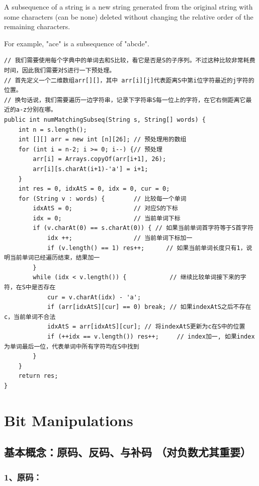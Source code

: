 \documentclass[9pt, b5paaper]{book}
\begin{document}
A subsequence of a string is a new string generated from the original string with some characters (can be none) deleted without changing the relative order of the remaining characters.

For example, "ace" is a subsequence of "abcde".
\begin{verbatim}
// 我们需要使用每个字典中的单词去和S比较，看它是否是S的子序列。不过这种比较非常耗费时间，因此我们需要对S进行一下预处理。
// 首先定义一个二维数组arr[][]，其中 arr[i][j]代表距离S中第i位字符最近的j字符的位置。
// 换句话说，我们需要遍历一边字符串，记录下字符串S每一位上的字符，在它右侧距离它最近的a-z分别在哪。
public int numMatchingSubseq(String s, String[] words) {
    int n = s.length();
    int [][] arr = new int [n][26]; // 预处理用的数组
    for (int i = n-2; i >= 0; i--) {// 预处理
        arr[i] = Arrays.copyOf(arr[i+1], 26);
        arr[i][s.charAt(i+1)-'a'] = i+1;
    }
    int res = 0, idxAtS = 0, idx = 0, cur = 0;
    for (String v : words) {        // 比较每一个单词
        idxAtS = 0;                 // 对应S的下标
        idx = 0;                    // 当前单词下标
        if (v.charAt(0) == s.charAt(0)) { // 如果当前单词首字符等于S首字符
            idx ++;                 // 当前单词下标加一
            if (v.length() == 1) res++;      // 如果当前单词长度只有1，说明当前单词已经遍历结束，结果加一
        }
        while (idx < v.length()) {            // 继续比较单词接下来的字符，在S中是否存在
            cur = v.charAt(idx) - 'a';
            if (arr[idxAtS][cur] == 0) break; // 如果indexAtS之后不存在c，当前单词不合法
            idxAtS = arr[idxAtS][cur]; // 将indexAtS更新为c在S中的位置
            if (++idx == v.length()) res++;     // index加一, 如果index为单词最后一位，代表单词中所有字符均在S中找到
        }
    }
    return res;
}
\end{verbatim}

\chapter{Bit Manipulations}
\label{sec-10}
\section{基本概念：原码、反码、与补码 （对负数尤其重要）}
\label{sec-10-1}
\subsection{1、原码：}
\label{sec-10-1-1}
\end{document}
